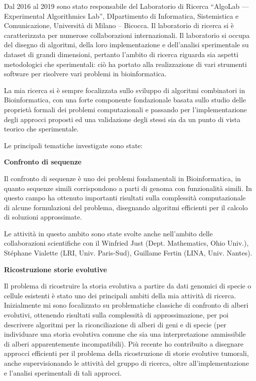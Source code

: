 \documentclass[11pt,a4paper,roman]{moderncv}        %
\begin{document}
  Dal 2016 al 2019 sono stato responsabile del Laboratorio di Ricerca
  ``AlgoLab --- Experimental Algorithmics Lab'', DIpartimento di
  Informatica, Sistemistica e Comunicazione, Università di Milano -- Bicocca.
  Il laboratorio di ricerca si è caratterizzata per numerose
  collaborazioni internazionali. Il laboratorio si occupa del disegno di
  algoritmi, della loro implementazione e dell'analisi sperimentale su
  dataset di grandi dimensioni, pertanto l'ambito di ricerca riguarda sia
  aspetti metodologici che sperimentali: ciò ha portato alla realizzazione
  di vari strumenti software per risolvere vari problemi in
  bioinformatica.

  La mia ricerca si è sempre focalizzata sullo sviluppo di algoritmi
  combinatori in Bioinformatica, con una forte componente fondazionale
  basata sullo studio delle proprietà formali dei problemi computazionali
  e passando per l'implementazione degli approcci proposti ed una
  validazione degli stessi sia da un punto di vista teorico che
  sperimentale.

  Le principali tematiche investigate sono state:

  \textbf{Confronto di sequenze}

  Il confronto di sequenze è uno dei problemi fondamentali in
  Bioinformatica, in quanto sequenze simili corrispondono a parti di
  genoma con funzionalità simili. In questo campo ha ottenuto importanti
  risultati sulla complessità computazionale di alcune formulazioni del
  problema, disegnando algoritmi efficienti per il calcolo di soluzioni
  approssimate.

  Le attività in questo ambito sono state svolte anche nell'ambito delle
  collaborazioni scientifiche con il Winfried Just (Dept. Mathematics,
  Ohio Univ.), Stéphane Vialette (LRI, Univ. Paris-Sud), Guillame Fertin
  (LINA, Univ. Nantes).

  \textbf{Ricostruzione storie evolutive}

  Il problema di ricostruire la storia evolutiva a partire da dati
  genomici di specie o cellule esistenti è stato uno dei principali ambiti
  della mia attività di ricerca. Inizialmente mi sono focalizzato su
  problematiche classiche di confronto di alberi evolutivi, ottenendo
  risultati sulla complessità di approssimazione, per poi descrivere
  algoritmi per la riconciliazione di alberi di geni e di specie (per
  individuare una storia evolutiva comune che sia una interpretazione
  ammissibile di alberi apparentemente incompatibili). Più recente ho
  contribuito a disegnare approcci efficienti per il problema della
  ricostruzione di storie evolutive tumorali, anche supervisionando le
  attività del gruppo di ricerca, oltre all'implementazione e l'analisi
  sperimentali di tali approcci.
\end{document}
